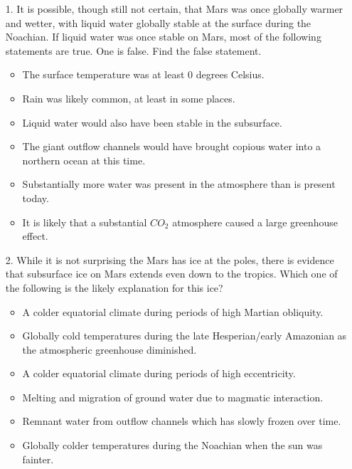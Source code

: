 \begin{enumerate}
    \item[1.] It is possible, though still not certain, that Mars was once globally warmer and wetter, with liquid water globally stable at the surface during the Noachian.  If liquid water was once stable on Mars, most of the following statements are true. One is false. Find the false statement.
    
    \begin{itemize}[label={$\bullet$}]
        \item The surface temperature was at least 0 degrees Celsius.
        \item Rain was likely common, at least in some places.
        \item Liquid water would also have been stable in the subsurface.
        \item The giant outflow channels would have brought copious water into a northern ocean at this time.
        \item Substantially more water was present in the atmosphere than is present today.
        \item It is likely that a substantial $CO_2$ atmosphere caused a large greenhouse effect.
    \end{itemize}

    \item[2.] While it is not surprising the Mars has ice at the poles, there is evidence that subsurface ice on Mars extends even down to the tropics. Which one of the following is the likely explanation for this ice?

    \begin{itemize}[label={$\bullet$}]
        \item A colder equatorial climate during periods of high Martian obliquity.
        \item Globally cold temperatures during the late Hesperian/early Amazonian as the atmospheric greenhouse diminished.
        \item A colder equatorial climate during periods of high eccentricity.
        \item Melting and migration of ground water due to magmatic interaction.
        \item Remnant water from outflow channels which has slowly frozen over time.
        \item Globally colder temperatures during the Noachian when the sun was fainter.
    \end{itemize}


\end{enumerate}
